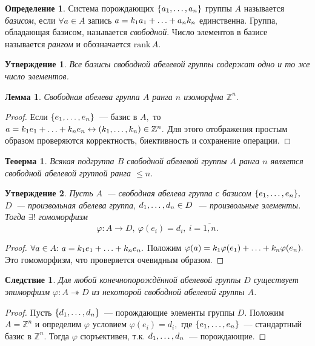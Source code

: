\documentclass[a4paper, 14pt]{extarticle}
\newcommand{\integers}{\mathbb{Z}}
\newcommand{\rank}{\mathrm{rank} \,}
\renewcommand{\phi}{\varphi}
\theoremstyle{definition}
\newtheorem{definition}{Определение}
\theoremstyle{plain}
\newtheorem{theorem}{Теоерма}
\numberwithin{theorem}{section}
\numberwithin{definition}{section}
\newtheorem{statement}{Утверждение}
\numberwithin{statement}{section}
\newtheorem{lemma}{Лемма}
\numberwithin{lemma}{section}
\newtheorem*{consequence*}{Следствие}
\numberwithin{consequence}{section}
\begin{document}
        \begin{definition}
            Система порождающих ${\{a_1,\mathellipsis,a_n\}}$ группы $A$ называется \textit{базисом}, если ${\forall a \in A}$ запись ${a = k_1a_1+\mathellipsis+a_nk_n}$ единственна. Группа, обладающая базисом, называется \textit{свободной}. Число элементов в базисе называется \textit{рангом} и обозначается $\rank A$.
        \end{definition}
        \begin{statement}
            Все базисы свободной абелевой группы содержат одно и то же число элементов.
        \end{statement}
        \newpage
        \begin{lemma}
            Свободная абелева группа $A$ ранга $n$ изоморфна $\integers^n.$
        \end{lemma}
        \begin{proof}
            Если ${\{e_1,\mathellipsis,e_n\}}$~--- базис в $A,$ то ${a = k_1e_1+\mathellipsis+k_ne_n \leftrightarrow (k_1,\mathellipsis,k_n) \in \integers^n.}$ Для этого отображения простым образом проверяются корректность, биективность и сохранение операции.
        \end{proof}
        \begin{theorem}
            Всякая подгруппа $B$ свободной абелевой группы $A$ ранга $n$ является свободной абелевой группой ранга $\leqslant n$. 
        \end{theorem}
        \begin{statement}
            Пусть $A$~--- свободная абелева группа с базисом ${\{e_1,\mathellipsis,e_n\},}$ $D$~--- произвольная абелева группа, ${d_1,\mathellipsis,d_n \in D}$~--- произвольные элементы. Тогда $\exists!$ гомоморфизм 
            \begin{equation*}
                \phi : A \rightarrow D, \ \phi(e_i) = d_i, \ i = \overline{1,n}.
            \end{equation*}
        \end{statement}
        \begin{proof}
            ${\forall a \in A{:} \ a = k_1e_1+\mathellipsis+k_ne_n.}$\newline
            Положим ${\phi(a) = k_1\phi(e_1)+\mathellipsis+k_n\phi(e_n).}$ Это гомоморфизм, что проверяется очевидным образом.
        \end{proof}
        \begin{consequence*}
            Для любой конечнопорождённой абелевой группы $D$ существует эпиморфизм ${\phi : A \twoheadrightarrow D}$ из некоторой свободной абелевой группы $A$. 
        \end{consequence*}
        \begin{proof}
            Пусть ${\{d_1,\mathellipsis,d_n\}}$~--- порождающие элементы группы $D.$ Положим ${A = \integers^n}$ и определим $\phi$ условием ${\phi(e_i) = d_i,}$ где ${\{e_1,\mathellipsis,e_n\}}$~--- стандартный базис в $\integers^n.$ Тогда $\phi$ сюръективен, т.к. ${d_1,\mathellipsis,d_n}$~--- порождающие.
        \end{proof}
        \newpage
\end{document}
